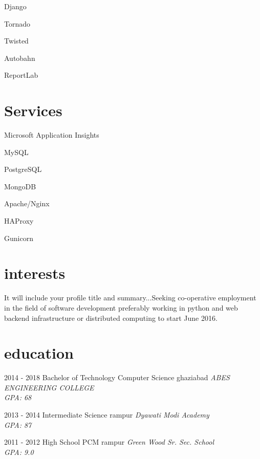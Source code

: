 \documentclass[]{friggeri-cv}
\begin{document}
\begin{aside}
                Django
            
                Tornado
            
                Twisted
            
                Autobahn
            
                ReportLab
            
    
        \section{ Services }
            
                Microsoft Application Insights
            
                MySQL
            
                PostgreSQL
            
                MongoDB
            
                Apache/Nginx
            
                HAProxy
            
                Gunicorn
            
    

\end{aside}

\section{interests}
It will include your profile title and summary...Seeking co-operative employment in the field of software development preferably working in python and web backend infrastructure or distributed computing to start June 2016.
\section{education}

\begin{entrylist}

  \entry
    { 2014 - 2018 }
    { Bachelor of Technology  {\normalfont Computer Science } }
    { ghaziabad }
    {\emph { ABES ENGINEERING COLLEGE \\
    GPA: 68 } }

  \entry
    { 2013 - 2014 }
    { Intermediate  {\normalfont Science } }
    { rampur }
    {\emph { Dyawati Modi Academy \\
    GPA: 87 } }

  \entry
    { 2011 - 2012 }
    { High School  {\normalfont PCM } }
    { rampur }
    {\emph { Green Wood Sr. Sec. School \\
    GPA: 9.0 } }

\end{entrylist}
\end{document}
